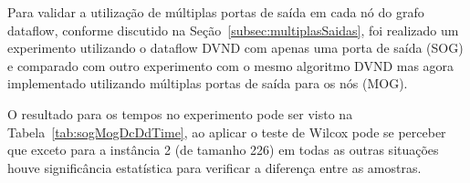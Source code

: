 

Para validar a utilização de múltiplas portas de saída em cada nó do grafo dataflow, conforme discutido na Seção~\ref{subsec:multiplasSaidas}, foi realizado um experimento utilizando o dataflow DVND com apenas uma porta de saída (SOG) e comparado com outro experimento com o mesmo algoritmo DVND mas agora implementado utilizando múltiplas portas de saída para os nós (MOG).

O resultado para os tempos no experimento pode ser visto na Tabela~\ref{tab:sogMogDcDdTime}, ao aplicar o teste de Wilcox pode se perceber que exceto para a instância 2 (de tamanho 226) em todas as outras situações houve significância estatística para verificar a diferença entre as amostras.

